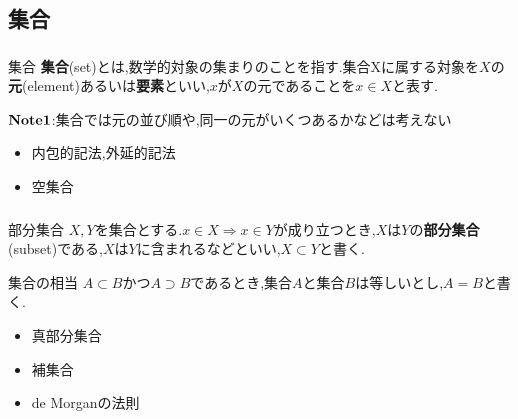 \documentclass[dvipdfmx,b4j]{jsarticle}
\begin{document}
\subsection{集合}

\subsubsection{}

\begin{definition}{集合}{}
\textbf{集合}(set)とは,数学的対象の集まりのことを指す.集合Xに属する対象を$X$の\textbf{元}(element)あるいは\textbf{要素}といい,$x$が$X$の元であることを$x\in X$と表す.
\end{definition}
\noindent $\bf{Note1}$:集合では元の並び順や,同一の元がいくつあるかなどは考えない
\begin{itemize}
\item 内包的記法,外延的記法
\item 空集合
\end{itemize}


\subsubsection{}
\begin{definition}{部分集合}{}
$X,Y$を集合とする.$x\in X\Longrightarrow x\in Y$が成り立つとき,$X$は$Y$の\textbf{部分集合}(subset)である,$X$は$Y$に含まれるなどといい,$X\subset Y$と書く.
\end{definition}
\begin{definition}{集合の相当}{}
$A\subset B $かつ$A\supset B$であるとき,集合$A$と集合$B$は等しいとし,$A = B $と書く.
\end{definition}
\begin{itemize}
    \item 真部分集合
    \item 補集合
    \item de Morganの法則
\end{itemize}
\end{document}
